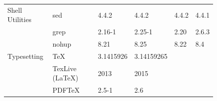 \begin{figure}[!htp]
\begin{table}[!ht]
{\begin{tabular}{|ll|l|l|l|l|}
\hline
\rowcolor{black!10}
\cellcolor{white} Shell Utilities                                      & \multicolumn{1}{|l|}{sed}                    & 4.4.2                                                               & 4.4.2                                                             & 4.4.2                                                                  & 4.4.1                                          \\
\rowcolor{black!5}
\cellcolor{white}                                                      & \multicolumn{1}{|l|}{grep}                   & 2.16-1                                                              & 2.25-1                                                            & 2.20                                                                   & 2.6.3                                          \\
\rowcolor{black!10}
\cellcolor{white}                                                      & \multicolumn{1}{|l|}{nohup}                  & 8.21                                                                & 8.25                                                              & 8.22                                                                   & 8.4                                            \\
\hline
\rowcolor{black!5}
\cellcolor{white} Typesetting                                          & \multicolumn{1}{|l|}{\TeX}                   & 3.1415926                                                           & 3.14159265                                                        &                                                                        &                                                \\
\rowcolor{black!10}
\cellcolor{white}                                                      & \multicolumn{1}{|l|}{TexLive (\LaTeX)}       & 2013                                                                & 2015                                                              &                                                                        &                                                \\
\rowcolor{black!5}
\cellcolor{white}                                                      & \multicolumn{1}{|l|}{PDF\TeX}                & 2.5-1                                                               & 2.6                                                               &                                                                        &                                                \\

\end{tabular}}
\end{table}
\end{figure}
